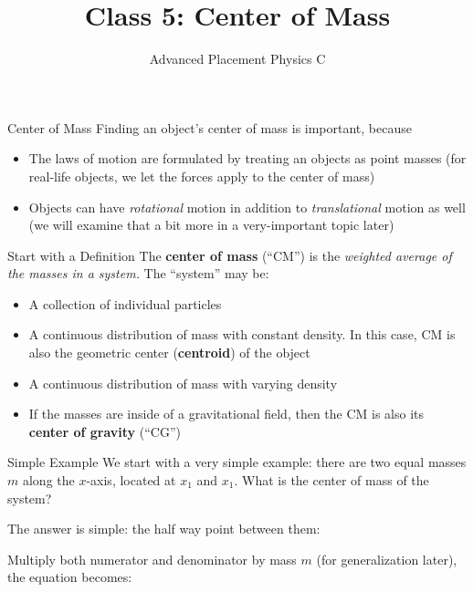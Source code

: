 \documentclass[12pt,compress,aspectratio=169]{beamer}
\title{Class 5: Center of Mass}
\subtitle{Advanced Placement Physics C}
\begin{document}
\begin{frame}
  \maketitle
\end{frame}



\begin{frame}{Center of Mass}
  Finding an object's center of mass is important, because
  \begin{itemize}
  \item The laws of motion are formulated by treating an objects as point
    masses (for real-life objects, we let the forces apply to the center of
    mass)
  \item Objects can have \emph{rotational} motion in addition to
    \emph{translational} motion as well (we will examine that a bit more in a
    very-important topic later)
  \end{itemize}
\end{frame}



\begin{frame}{Start with a Definition}
  The \textbf{center of mass} (``CM'') is the \emph{weighted average of the
    masses in a system.} The ``system'' may be:
  \begin{itemize}
  \item A collection of individual particles
  \item A continuous distribution of mass with constant density. In this case,
    CM is also the geometric center (\textbf{centroid}) of the object
  \item A continuous distribution of mass with varying density
  \item If the masses are inside of a gravitational field, then the CM is also
    its \textbf{center of gravity} (``CG'')
  \end{itemize}
\end{frame}



\begin{frame}{Simple Example}
  We start with a very simple example: there are two equal masses $m$ along the
  $x$-axis, located at $x_1$ and $x_1$. What is the center of mass of the
  system?
  \begin{center}
  \end{center}
  The answer is simple: the half way point between them:


  Multiply both numerator and denominator by mass $m$ (for generalization
  later), the equation becomes:

\end{frame}
\end{document}
